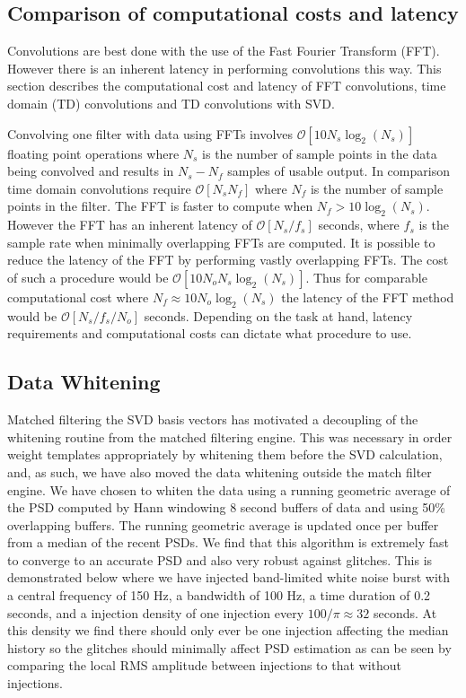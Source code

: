 \subsection{Comparison of computational costs and latency}
Convolutions are best done with the use of the Fast Fourier Transform (FFT).
However there is an inherent latency in performing convolutions this way. This
section describes the computational cost and latency of FFT convolutions, time 
domain (TD) convolutions and TD convolutions with SVD.  

Convolving one filter with data using FFTs involves 
$\mathcal{O}[10 N_s \log_2(N_s)]$
floating point operations where $N_s$ is the number of sample points in
the data being convolved and results in $N_s - N_f$ samples of usable output.  
In comparison time domain convolutions require
$\mathcal{O}[N_s N_f]$ where $N_f$ is the number of sample points in the
filter.  The FFT is faster to compute when $N_f > 10 \log_2(N_s)$.  However
the FFT has an inherent latency of $\mathcal{O}[N_s/f_s]$ seconds, where
$f_s$ is the sample rate when minimally overlapping FFTs are computed. It is
possible to reduce the latency of the FFT by performing vastly overlapping
FFTs.  The cost of such a procedure would be 
$\mathcal{O}[10 N_o N_s \log_2(N_s)]$.  Thus for comparable computational
cost where $N_f \approx 10 N_o \log_2(N_s)$ the latency of the FFT method 
would be $\mathcal{O}[N_s/f_s/N_o]$ seconds.  Depending on the task at hand,
latency requirements and computational costs can dictate what procedure to
use.  

\subsection{Data Whitening}
Matched filtering the SVD basis vectors has motivated a decoupling of the
whitening routine from the matched filtering engine. This was necessary in
order weight templates appropriately by whitening them before the SVD
calculation, and, as such, we have also moved the data whitening outside the
match filter engine. We have chosen to whiten the data using a running
geometric average of the PSD computed by Hann windowing 8 second buffers of
data and using 50\% overlapping buffers. The running geometric average is
updated once per buffer from a median of the recent PSDs. We find that this
algorithm is extremely fast to converge to an accurate PSD and also very robust
against glitches. This is demonstrated below where we have injected
band-limited white noise burst with a central frequency of 150 Hz, a bandwidth
of 100 Hz, a time duration of 0.2 seconds, and a injection density of one
injection every $100/\pi \approx 32$ seconds. At this density we find there
should only ever be one injection affecting the median history so the glitches
should minimally affect PSD estimation as can be seen by comparing the local
RMS amplitude between injections to that without injections.

